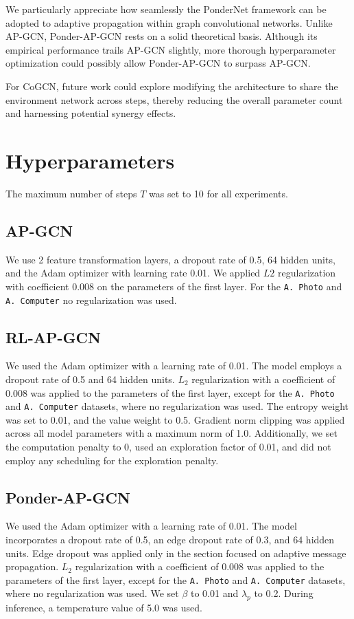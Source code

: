 \documentclass{gdl}
\begin{document}
We particularly appreciate how seamlessly the PonderNet framework can be adopted to adaptive propagation within graph convolutional networks. Unlike AP-GCN, Ponder-AP-GCN rests on a solid theoretical basis. Although its empirical performance trails AP-GCN slightly, more thorough hyperparameter optimization could possibly allow Ponder-AP-GCN to surpass AP-GCN.

For CoGCN, future work could explore modifying the architecture to share the environment network across steps, thereby reducing the overall parameter count and harnessing potential synergy effects.


\clearpage


\clearpage

\appendix

\section{Hyperparameters}
The maximum number of steps $T$ was set to 10 for all experiments.

\subsection{AP-GCN}
\label{lab:hyper-ap-gcn}
We use 2 feature transformation layers, a dropout rate of 0.5, 64 hidden units, and the Adam optimizer with learning rate 0.01. We applied $L2$ regularization with coefficient 0.008 on the parameters of the first layer. For the \texttt{A. Photo} and \texttt{A. Computer} no regularization was used.

\subsection{RL-AP-GCN}
\label{lab:hyper-rl-gcn}
We used the Adam optimizer with a learning rate of 0.01. The model employs a dropout rate of 0.5 and 64 hidden units. $L_2$ regularization with a coefficient of 0.008 was applied to the parameters of the first layer, except for the \texttt{A. Photo} and \texttt{A. Computer} datasets, where no regularization was used. The entropy weight was set to 0.01, and the value weight to 0.5. Gradient norm clipping was applied across all model parameters with a maximum norm of 1.0. Additionally, we set the computation penalty to 0, used an exploration factor of 0.01, and did not employ any scheduling for the exploration penalty.

\subsection{Ponder-AP-GCN}
\label{lab:hyper-ponder-gcn}
We used the Adam optimizer with a learning rate of 0.01. The model incorporates a dropout rate of 0.5, an edge dropout rate of 0.3, and 64 hidden units. Edge dropout was applied only in the section focused on adaptive message propagation. $L_2$ regularization with a coefficient of 0.008 was applied to the parameters of the first layer, except for the \texttt{A. Photo} and \texttt{A. Computer} datasets, where no regularization was used. We set $\beta$ to 0.01 and $\lambda_p$ to 0.2. During inference, a temperature value of 5.0 was used.
\end{document}
